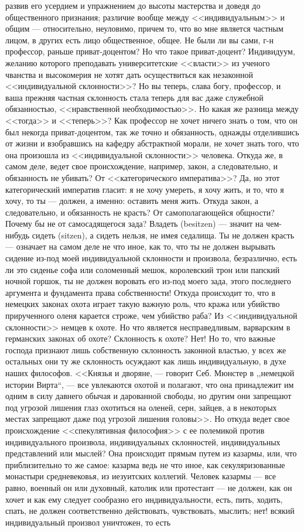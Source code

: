\documentclass[12pt]{article}
\begin{document}
развив его усердием и упражнением до высоты мастерства и доведя до общественного признания; различие вообще между <<индивидуальным>> и общим --- относительно, неуловимо, причем то, что во мне является частным лицом, в других есть лицо общественное, общее. Не были ли вы сами, г-н профессор, раньше приват-доцентом? Но что такое приват-доцент? Индивидуум, желанию которого преподавать университетские <<власти>> из ученого чванства и высокомерия не хотят дать осуществиться как незаконной <<индивидуальной склонности>>? Но вы теперь, слава богу, профессор, и ваша прежняя частная склонность стала теперь для вас даже служебной обязанностью, <<нравственной необходимостью>>. Но какая же разница между <<тогда>> и <<теперь>>? Как профессор не хочет ничего знать о том, что он был некогда приват-доцентом, так же точно и обязанность, однажды отделившись от жизни и взобравшись на кафедру абстрактной морали, не хочет знать того, что она произошла из <<индивидуальной склонности>> человека. Откуда же, в самом деле, ведет свое происхождение, например, закон, а следовательно, и обязанность не убивать? От <<категорического императива>>? Да, но этот категорический императив гласит: я не хочу умереть, я хочу жить, и то, что я хочу, то ты --- должен, а именно: оставить меня жить. Откуда закон, а следовательно, и обязанность не красть? От самополагающейся общности? Почему бы не от самосадящегося зада? Владеть (besitzen) --- значит на чем-нибудь сидеть (sitzen), а сидеть нельзя, не имея седалища. Ты не должен красть --- означает на самом деле не что иное, как то, что ты не должен вырывать сидение из-под моей индивидуальной склонности и произвола, безразлично, есть ли это сиденье софа или соломенный мешок, королевский трон или папский ночной горшок, ты не должен воровать его из-под моего зада, этого последнего аргумента и фундамента права собственности! Откуда происходит то, что в немецких законах охота играет такую важную роль, что кража или убийство прирученного оленя карается строже, чем убийство раба? Из <<индивидуальной склонности>> немцев к охоте. Но что является несправедливым, варварским в германских законах об охоте? Склонность к охоте? Нет! Но то, что важные господа признают лишь собственную склонность законной властью, у всех же остальных они ту же склонность осуждают как лишь индивидуальную, в духе наших философов. <<Князья и дворяне, --- говорит Себ. Мюнстер в ,,немецкой истории Вирта``, --- все увлекаются охотой и полагают, что она принадлежит им одним в силу давнего обычая и дарованной свободы, но другим они запрещают под угрозой лишения глаз охотиться на оленей, серн, зайцев, а в некоторых местах запрещают даже под угрозой лишения головы>>. Но откуда ведет свое происхождение <<спекулятивная философия>> с ее полемикой против индивидуального произвола, индивидуальных склонностей, индивидуальных представлений или мыслей? Она происходит прямым путем из казармы, или, что приблизительно то же самое: казарма ведь не что иное, как секуляризованные монастыри средневековья, из иезуитских коллегий. Человек казармы --- все равно, военный он или духовный, католик или протестант --- не должен, как он хочет и как ему следует сообразно его индивидуальности, есть, пить, ходить, спать, не должен соответственно действовать, чувствовать, мыслить; нет! всякий индивидуальный произвол уничтожен, то есть 
\end{document}
